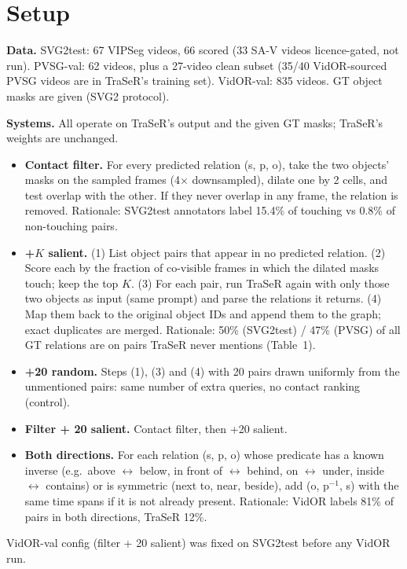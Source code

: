 \documentclass[11pt,a4paper]{article}
\begin{document}
\section{Setup}
\textbf{Data.} SVG2test: 67 VIPSeg videos, 66 scored (33 SA-V videos licence-gated, not run). PVSG-val: 62 videos, plus a 27-video clean
subset (35/40 VidOR-sourced PVSG videos are in TraSeR's training set). VidOR-val: 835 videos. GT object masks are given (SVG2 protocol).

\textbf{Systems.} All operate on TraSeR's output and the given GT masks; TraSeR's weights are unchanged.
\begin{itemize}\setlength{\itemsep}{2pt}
\item \textbf{Contact filter.} For every predicted relation (s, p, o), take the two objects' masks on the sampled frames
      (4$\times$ downsampled), dilate one by 2 cells, and test overlap with the other. If they never overlap in any frame, the
      relation is removed. Rationale: SVG2test annotators label 15.4\% of touching vs 0.8\% of non-touching pairs.
\item \textbf{+$K$ salient.} (1) List object pairs that appear in no predicted relation. (2) Score each by the fraction of
      co-visible frames in which the dilated masks touch; keep the top $K$. (3) For each pair, run TraSeR again with only those
      two objects as input (same prompt) and parse the relations it returns. (4) Map them back to the original object IDs and
      append them to the graph; exact duplicates are merged. Rationale: 50\% (SVG2test) / 47\% (PVSG) of all GT relations are
      on pairs TraSeR never mentions (Table~1).
\item \textbf{+20 random.} Steps (1), (3) and (4) with 20 pairs drawn uniformly from the unmentioned pairs: same number of extra
      queries, no contact ranking (control).
\item \textbf{Filter + 20 salient.} Contact filter, then +20 salient.
\item \textbf{Both directions.} For each relation (s, p, o) whose predicate has a known inverse (e.g.\ above $\leftrightarrow$ below,
      in front of $\leftrightarrow$ behind, on $\leftrightarrow$ under, inside $\leftrightarrow$ contains) or is symmetric (next to,
      near, beside), add (o, p$^{-1}$, s) with the same time spans if it is not already present. Rationale: VidOR labels 81\% of
      pairs in both directions, TraSeR 12\%.
\end{itemize}
VidOR-val config (filter + 20 salient) was fixed on SVG2test before any VidOR run.
\end{document}
